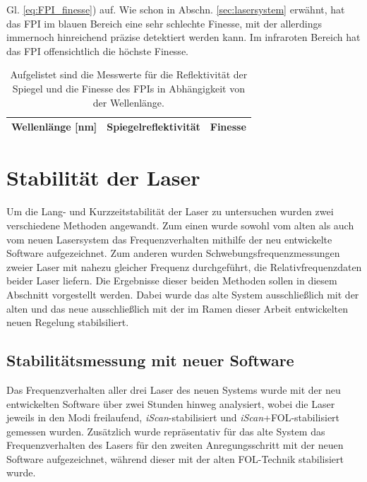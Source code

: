 Gl. \eqref{eq:FPI_finesse}) auf. Wie schon in Abschn. \ref{sec:lasersystem}
erwähnt, hat das FPI im blauen Bereich eine sehr schlechte Finesse, mit der allerdings immernoch hinreichend präzise detektiert werden kann. Im infraroten
Bereich hat das FPI offensichtlich die höchste Finesse.
\begin{table}[h]
	\begin{tabular}{ccc}
		\toprule
		\multicolumn{1}{C{0.30\textwidth}}{Wellenlänge [nm]} &
		\multicolumn{1}{C{0.31\textwidth}}{Spiegelreflektivität} &
		\multicolumn{1}{C{0.30\textwidth}}{Finesse}\\
		\midrule[1px]
		\hline
		
		\bottomrule[1px]
	\end{tabular}
	\caption[FPI Finesse]{Aufgelistet sind die Messwerte für die Reflektivität der
	Spiegel und die Finesse des FPIs in Abhängigkeit von der Wellenlänge.}
	\label{tab:finesse}
\end{table}

\section{Stabilität der Laser}\label{sec:stabilitaet_der_laser}
Um die Lang- und Kurzzeitstabilität der Laser zu untersuchen wurden zwei
verschiedene Methoden angewandt. Zum einen wurde sowohl vom alten als auch vom
neuen Lasersystem das Frequenzverhalten mithilfe der neu entwickelte Software
aufgezeichnet. Zum anderen wurden Schwebungsfrequenzmessungen zweier Laser mit
nahezu gleicher Frequenz durchgeführt, die Relativfrequenzdaten beider Laser
liefern. Die Ergebnisse dieser beiden Methoden sollen in diesem Abschnitt
vorgestellt werden. Dabei wurde das alte System ausschließlich mit der alten und
das neue ausschließlich mit der im Ramen dieser Arbeit entwickelten
neuen Regelung stabilsiliert.

\subsection{Stabilitätsmessung mit neuer
Software}\label{sec:stabilitaetsmessungen_software} Das Frequenzverhalten
aller drei Laser des neuen Systems wurde mit der neu entwickelten Software über zwei Stunden hinweg analysiert, wobei die
Laser jeweils in den Modi freilaufend, \textit{iScan}-stabilisiert und
\textit{iScan}+FOL-stabilisiert gemessen wurden. Zusätzlich wurde repräsentativ
für das alte System das Frequenzverhalten des Lasers für den zweiten
Anregungsschritt mit der neuen Software aufgezeichnet, während dieser
mit der alten FOL-Technik stabilisiert wurde.

